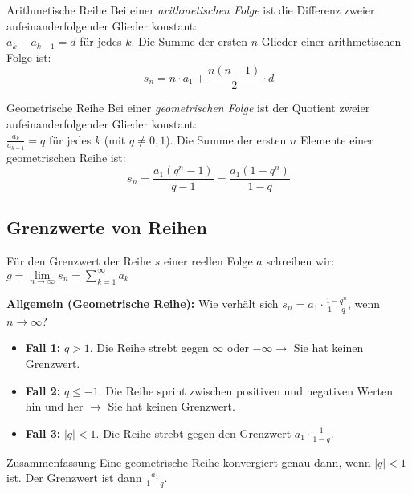 \begin{definition}{Arithmetische Reihe}
    Bei einer \emph{arithmetischen Folge} ist die Differenz zweier aufeinanderfolgender Glieder konstant:\\ $a_k - a_{k-1} = d$ für jedes $k$.
    Die Summe der ersten $n$ Glieder einer arithmetischen Folge ist: \[s_n = n \cdot a_1 + \frac{n(n-1)}{2} \cdot d\]
\end{definition}

\begin{definition}{Geometrische Reihe}
    Bei einer \emph{geometrischen Folge} ist der Quotient zweier aufeinanderfolgender Glieder konstant:\\ $\frac{a_k}{a_{k-1}} = q$ für jedes $k$ (mit $q \neq 0, 1$).
    Die Summe der ersten $n$ Elemente einer geometrischen Reihe ist: \[s_n = \frac{a_1 (q^n - 1)}{q - 1} = \frac{a_1 (1 - q^n)}{1 - q}\]
\end{definition}

\subsection{Grenzwerte von Reihen}\label{subsec:grenzwerte-reihen}

Für den Grenzwert der Reihe $s$ einer reellen Folge $a$ schreiben wir: $g = \lim \limits_{n \rightarrow \infty} s_n = \sum_{k=1}^\infty a_k$


\textbf{Allgemein (Geometrische Reihe):} Wie verhält sich $s_n = a_1 \cdot \frac{1-q^n}{1-q}$, wenn $n \rightarrow \infty$?
\begin{itemize}
    \item[] \textbf{Fall 1:} $q > 1$.
    Die Reihe strebt gegen $\infty$ oder $-\infty \rightarrow$ Sie hat keinen Grenzwert.
    \item[] \textbf{Fall 2:} $q \leq -1$.
    Die Reihe sprint zwischen positiven und negativen Werten hin und her $\rightarrow$ Sie hat keinen Grenzwert.
    \item[] \textbf{Fall 3:} $|q| < 1$.
    Die Reihe strebt gegen den Grenzwert $a_1 \cdot \frac{1}{1-q}$.
\end{itemize}

\begin{definition}{Zusammenfassung}
    Eine geometrische Reihe konvergiert genau dann, wenn $|q| < 1$ ist.
    Der Grenzwert ist dann $\frac{a_1}{1-q}$.
\end{definition}